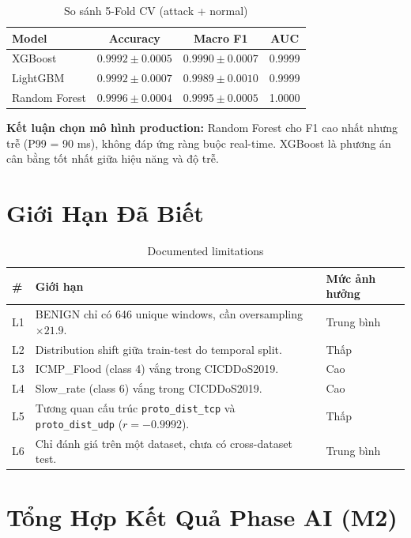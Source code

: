 \documentclass[12pt,a4paper]{article}
\begin{document}
\begin{table}[H]
\centering
\caption{So sánh 5-Fold CV (attack + normal)}
\begin{tabular}{lccc}
\toprule
\textbf{Model} & \textbf{Accuracy} & \textbf{Macro F1} & \textbf{AUC} \\
\midrule
XGBoost & $0.9992 \pm 0.0005$ & $0.9990 \pm 0.0007$ & 0.9999 \\
LightGBM & $0.9992 \pm 0.0007$ & $0.9989 \pm 0.0010$ & 0.9999 \\
Random Forest & $0.9996 \pm 0.0004$ & $0.9995 \pm 0.0005$ & 1.0000 \\
\bottomrule
\end{tabular}
\end{table}

\textbf{Kết luận chọn mô hình production:}
Random Forest cho F1 cao nhất nhưng trễ (P99 = 90 ms), không đáp ứng ràng buộc real-time. XGBoost là phương án cân bằng tốt nhất giữa hiệu năng và độ trễ.

\section{Giới Hạn Đã Biết}

\begin{table}[H]
\centering
\caption{Documented limitations}
\begin{tabular}{p{0.8cm} p{9.2cm} p{3cm}}
\toprule
\textbf{\#} & \textbf{Giới hạn} & \textbf{Mức ảnh hưởng} \\
\midrule
L1 & BENIGN chỉ có 646 unique windows, cần oversampling $\times 21.9$. & Trung bình \\
L2 & Distribution shift giữa train-test do temporal split. & Thấp \\
L3 & ICMP\_Flood (class 4) vắng trong CICDDoS2019. & Cao \\
L4 & Slow\_rate (class 6) vắng trong CICDDoS2019. & Cao \\
L5 & Tương quan cấu trúc \texttt{proto\_dist\_tcp} và \texttt{proto\_dist\_udp} ($r=-0.9992$). & Thấp \\
L6 & Chỉ đánh giá trên một dataset, chưa có cross-dataset test. & Trung bình \\
\bottomrule
\end{tabular}
\end{table}

\section{Tổng Hợp Kết Quả Phase AI (M2)}
\end{document}
